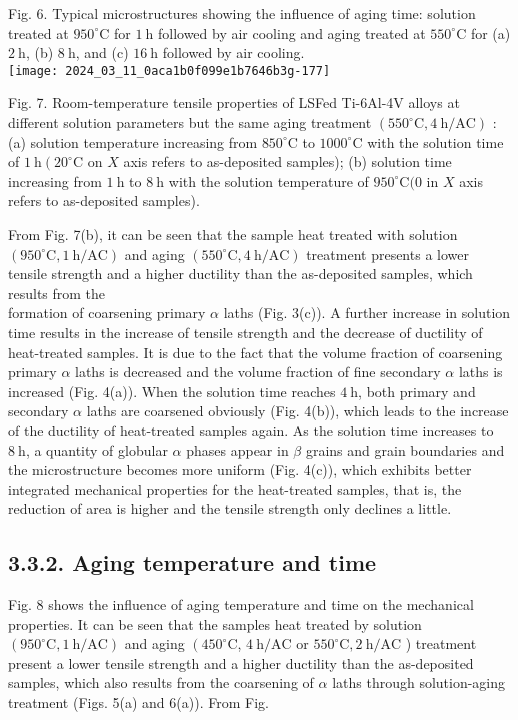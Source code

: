 \documentclass[10pt]{article}
\begin{document}
Fig. 6. Typical microstructures showing the influence of aging time: solution treated at $950^{\circ} \mathrm{C}$ for $1 \mathrm{~h}$ followed by air cooling and aging treated at $550^{\circ} \mathrm{C}$ for (a) $2 \mathrm{~h}$, (b) $8 \mathrm{~h}$, and (c) $16 \mathrm{~h}$ followed by air cooling.\\
\texttt{[image: 2024\_03\_11\_0aca1b0f099e1b7646b3g-177]}

Fig. 7. Room-temperature tensile properties of LSFed Ti-6Al-4V alloys at different solution parameters but the same aging treatment $\left(550^{\circ} \mathrm{C}, 4 \mathrm{~h} / \mathrm{AC}\right)$ : (a) solution temperature increasing from $850^{\circ} \mathrm{C}$ to $1000^{\circ} \mathrm{C}$ with the solution time of $1 \mathrm{~h}\left(20^{\circ} \mathrm{C}\right.$ on $X$ axis refers to as-deposited samples); (b) solution time increasing from $1 \mathrm{~h}$ to $8 \mathrm{~h}$ with the solution temperature of $950^{\circ} \mathrm{C}(0$ in $X$ axis refers to as-deposited samples).

From Fig. 7(b), it can be seen that the sample heat treated with solution $\left(950^{\circ} \mathrm{C}, 1 \mathrm{~h} / \mathrm{AC}\right)$ and aging $\left(550^{\circ} \mathrm{C}, 4 \mathrm{~h} / \mathrm{AC}\right)$ treatment presents a lower tensile strength and a higher ductility than the as-deposited samples, which results from the\\
formation of coarsening primary $\alpha$ laths (Fig. 3(c)). A further increase in solution time results in the increase of tensile strength and the decrease of ductility of heat-treated samples. It is due to the fact that the volume fraction of coarsening primary $\alpha$ laths is decreased and the volume fraction of fine secondary $\alpha$ laths is increased (Fig. 4(a)). When the solution time reaches $4 \mathrm{~h}$, both primary and secondary $\alpha$ laths are coarsened obviously (Fig. 4(b)), which leads to the increase of the ductility of heat-treated samples again. As the solution time increases to $8 \mathrm{~h}$, a quantity of globular $\alpha$ phases appear in $\beta$ grains and grain boundaries and the microstructure becomes more uniform (Fig. 4(c)), which exhibits better integrated mechanical properties for the heat-treated samples, that is, the reduction of area is higher and the tensile strength only declines a little.

\subsection*{3.3.2. Aging temperature and time}
Fig. 8 shows the influence of aging temperature and time on the mechanical properties. It can be seen that the samples heat treated by solution $\left(950^{\circ} \mathrm{C}, 1 \mathrm{~h} / \mathrm{AC}\right)$ and aging $\left(450^{\circ} \mathrm{C}\right.$, $4 \mathrm{~h} / \mathrm{AC}$ or $550^{\circ} \mathrm{C}, 2 \mathrm{~h} / \mathrm{AC}$ ) treatment present a lower tensile strength and a higher ductility than the as-deposited samples, which also results from the coarsening of $\alpha$ laths through solution-aging treatment (Figs. 5(a) and 6(a)). From Fig.
\end{document}

